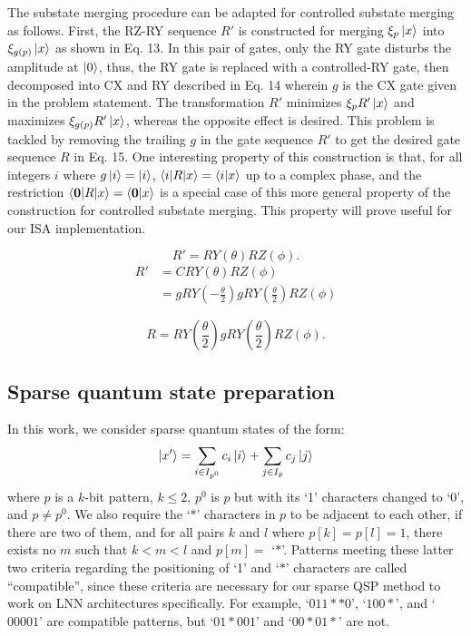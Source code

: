 The substate merging procedure can be adapted for controlled substate merging 
as follows. First, the
RZ-RY sequence $R'$ is constructed for merging $\xi_p\mathinner{|{x}\rangle}$ into $\xi_{g(p)}\mathinner{|{x}\rangle}$ as shown in Eq. 13. In this pair of gates, only the RY gate disturbs
the amplitude at $\mathinner{|{0}\rangle}$, thus, the RY gate is replaced with a controlled-RY
gate, then decomposed into CX and RY described in Eq. 14 wherein $g$ is the CX gate given in the problem statement. The transformation $R'$
minimizes $\xi_pR'\mathinner{|{x}\rangle}$ and maximizes $\xi_{g(p)}R'\mathinner{|{x}\rangle}$, whereas the opposite effect is desired. This problem is tackled by removing the trailing $g$ in the
gate sequence $R'$ to get the desired gate sequence $R$ in Eq. 15. One interesting property of this construction is that, for all
integers $i$ where $g\mathinner{|{i}\rangle} = \mathinner{|{i}\rangle}$, $\mathinner{\langle{i|R|x}\rangle} = \mathinner{\langle{i|x}\rangle}$ up to
a complex phase, and the restriction $\mathinner{\langle{\mathbf{0}|R|x}\rangle} = \mathinner{\langle{\mathbf{0}|x}\rangle}$ is a special
case of this more general property of the construction for controlled substate
merging. This property will prove useful for our ISA implementation.

\begin{equation} \label{eq13}
R' = RY(\theta)RZ(\phi).
\end{equation}
\begin{align} \label{eq14}
R' &= CRY(\theta)RZ(\phi) \nonumber \\
&= gRY(-\frac{\theta}{2})gRY(\frac{\theta}{2})RZ(\phi)
\end{align}

\begin{equation} \label{eq15}
R = RY(\frac{\theta}{2})gRY(\frac{\theta}{2})RZ(\phi).
\end{equation}

\subsection{Sparse quantum state preparation}
In this work, we consider sparse quantum states of the form:
\begin{equation}
\mathinner{|{x'}\rangle} = \sum_{i \in I_{p^0}}{c_i\mathinner{|{i}\rangle}} + \sum_{j \in I_p}{c_j\mathinner{|{j}\rangle}}
\end{equation}
where $p$ is a $k$-bit pattern, $k \leq 2$, $p^0$ is $p$ but with its `1'
characters changed to `0', and $p \neq p^0$. We also require the `$*$' 
characters in $p$ to be adjacent to each other, if there are two of them, and 
for all pairs $k$ and $l$ where $p[k] = p[l] = 1$, there exists no $m$ such 
that $k < m < l$ and $p[m] = $ `$*$'. Patterns meeting these latter two criteria 
regarding the positioning of `1' and `$*$' characters are called ``compatible'',
since these criteria are necessary for our sparse QSP method to work on LNN 
architectures specifically. For example, `$011**0$', `$100*$', and `$00001$' are
compatible patterns, but `$01*001$' and `$00*01*$' are not.

